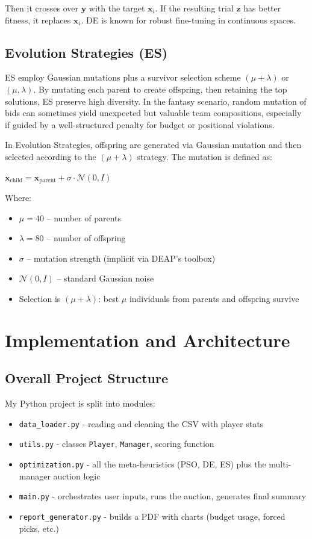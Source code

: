 \documentclass[sigconf]{acmart}
\begin{document}
	Then it crosses over $\mathbf{y}$ with the target $\mathbf{x}_i$. If the resulting trial $\mathbf{z}$ has better fitness, it replaces $\mathbf{x}_i$. DE is known for robust fine-tuning in continuous spaces.
	
	\subsection{Evolution Strategies (ES)}
	ES employ Gaussian mutations plus a survivor selection scheme $(\mu+\lambda)$ or $(\mu,\lambda)$. By mutating each parent to create offspring, then retaining the top solutions, ES preserve high diversity. In the fantasy scenario, random mutation of bids can sometimes yield unexpected but valuable team compositions, especially if guided by a well-structured penalty for budget or positional violations.
	
	In Evolution Strategies, offspring are generated via Gaussian mutation and then selected according to the $(\mu + \lambda)$ strategy. The mutation is defined as:
	
	$
	\mathbf{x}_{\text{child}} = \mathbf{x}_{\text{parent}} + \sigma \cdot \mathcal{N}(0, I)
	$
	
	Where:
	\begin{itemize}
		\item $\mu = 40$ – number of parents
		\item $\lambda = 80$ – number of offspring
		\item $\sigma$ – mutation strength (implicit via DEAP's toolbox)
		\item $\mathcal{N}(0, I)$ – standard Gaussian noise
		\item Selection is $(\mu + \lambda)$: best $\mu$ individuals from parents and offspring survive
	\end{itemize}
	
	
	\section{Implementation and Architecture}
	\label{sec:implementation}
	
	\subsection{Overall Project Structure}
	My Python project is split into modules:
	\begin{itemize}
\item \texttt{data\_loader.py} - reading and cleaning the CSV with player stats
\item \texttt{utils.py} - classes \texttt{Player}, \texttt{Manager}, scoring function
\item \texttt{optimization.py} - all the meta-heuristics (PSO, DE, ES) plus the multi-manager auction logic
\item \texttt{main.py} - orchestrates user inputs, runs the auction, generates final summary
\item \texttt{report\_generator.py} - builds a PDF with charts (budget usage, forced picks, etc.)
	\end{itemize}
	
\end{document}
